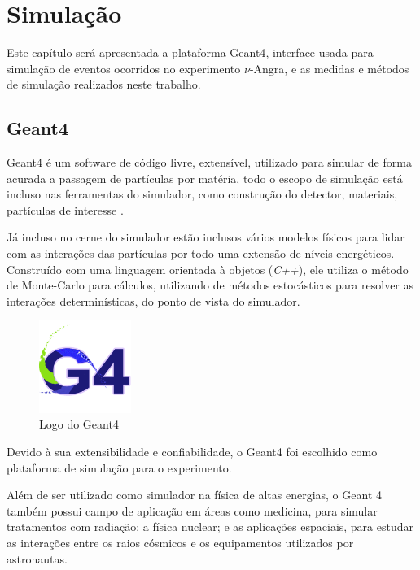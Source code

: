 \chapter{Simulação} \label{cap:simulacao}
\vspace{-2cm}

Este capítulo será apresentada a plataforma \ac{Geant4}, interface usada para simulação de eventos ocorridos no experimento $\nu$-Angra, e as medidas e métodos de simulação realizados neste trabalho.

\section{Geant4}

Geant4 é um software de código livre, extensível,  utilizado para simular de forma acurada a passagem de partículas por matéria, todo o escopo de simulação está incluso nas ferramentas do simulador, como construção do detector, materiais, partículas de interesse \cite{geant4doc}.

Já incluso no cerne do simulador estão inclusos vários modelos físicos para lidar com as interações das partículas por todo uma extensão de níveis energéticos. Construído com uma linguagem orientada à objetos (\emph{C++}), ele utiliza o método de Monte-Carlo para cálculos, utilizando de métodos estocásticos para resolver as interações determinísticas, do ponto de vista do simulador.

\begin{figure}[H]
	\centering
	\includegraphics[width=3cm]{textuais/simulacao/figuras/g4.png}
	\caption{Logo do Geant4}
	\label{fig:logo}
\end{figure}

Devido à sua extensibilidade e confiabilidade, o Geant4 foi escolhido como plataforma de simulação para o experimento.

Além de ser utilizado como simulador na física de altas energias, o Geant 4 também possui campo de aplicação em áreas como medicina, para simular tratamentos com radiação; a física nuclear; e as aplicações espaciais, para estudar as interações entre os raios cósmicos e os equipamentos utilizados por astronautas.

